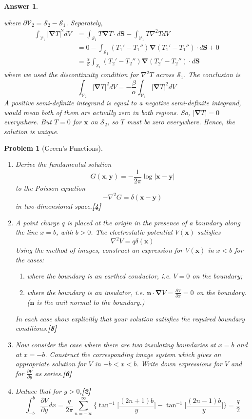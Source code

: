 \documentclass[a4paper]{article}
\newtheorem{ans}{Answer}[section]
\theoremstyle{new}
\newtheorem{qns}{Problem}[section]
\begin{document}
\begin{ans}
\begin{enumerate}[label=(\roman*)]
where $\partial\mathcal{V}_2=\mathcal{S}_2-\mathcal{S}_1$. Separately, 
\begin{align}
\int_{\mathcal{V}_1}|\boldsymbol{\nabla}T|^2dV&=\int_{\mathcal{S}_1}T\boldsymbol{\nabla}T\cdot d\mathbf{S}-\int_{\mathcal{V}_1}T\nabla^2TdV\nonumber\\&=0-\int_{\mathcal{S}_1}(T_1'-T_1'')\boldsymbol{\nabla}(T_1'-T_1'')\cdot d\mathbf{S}+0\nonumber\\&=\frac{\alpha}{\beta}\int_{\mathcal{S}_1}(T_2'-T_2'')\boldsymbol{\nabla}(T_2'-T_2'')\cdot d\mathbf{S}\nonumber
\end{align}
where we used the discontinuity condition for $\nabla^2T$ across $\mathcal{S}_1$. The conclusion is 
$$\int_{\mathcal{V}_2}|\boldsymbol{\nabla}T|^2dV=-\frac{\beta}{\alpha}\int_{\mathcal{V}_1}|\boldsymbol{\nabla}T|^2dV$$
A positive semi-definite integrand is equal to a negative semi-definite integrand, would mean both of them are actually zero in both regions. So, $|\boldsymbol{\nabla}T|=0$ everywhere. But $T=0$ for $\mathbf{x}$ on $\mathcal{S}_2$, so $T$ must be zero everywhere. Hence, the solution is unique.
\end{enumerate}
\end{ans}
\begin{qns}[Green's Functions]\leavevmode
\begin{enumerate}[label=(\alph*)]
\item Derive the fundamental solution
$$G(\mathbf{x},\mathbf{y})=-\frac{1}{2\pi}\log|\mathbf{x}-\mathbf{y}|$$
to the Poisson equation
$$-\nabla^2G=\delta(\mathbf{x}-\mathbf{y})$$
in two-dimensional space.\hfill\textbf{[4]}
\item 
A point charge $q$ is placed at the origin in the presence of a boundary along the line $x = b$, with $b > 0$. The electrostatic potential $V(\mathbf{x})$ satisfies
$$\nabla^2V=q\delta(\mathbf{x})$$
Using the method of images, construct an expression for $V(\mathbf{x})$ in $x < b$ for the cases:
\begin{enumerate}[label=(\roman*)]
    \item where the boundary is an earthed conductor, i.e. $V = 0$ on the boundary;
    \item where the boundary is an insulator, i.e. $\mathbf{n}\cdot\boldsymbol{\nabla}V=\frac{\partial V}{\partial x}=0$ on the boundary. ($\mathbf{n}$ is the unit normal to the boundary.)
\end{enumerate}
In each case show explicitly that your solution satisfies the required boundary conditions.\hfill\textbf{[8]}
\item Now consider the case where there are two insulating boundaries at $x = b$  and at $x = −b$. Construct the corresponding image system which gives an appropriate solution for $V$ in $−b < x < b$. Write down expressions for $V$ and for $\frac{\partial V}{\partial y}$ as series.\hfill\textbf{[6]}
\item Deduce that for $y > 0$,\hfill\textbf{[2]}
$$\int_{-b}^b\frac{\partial V}{\partial y}dx=\frac{q}{2\pi}\sum_{n=-\infty}^{\infty}\bigg\{\tan^{-1}\bigg[\frac{(2n+1)b}{y}\bigg]-\tan^{-1}\bigg[\frac{(2n-1)b}{y}\bigg]\bigg\}=\frac{q}{2}$$
\end{enumerate}
\end{qns}
\end{document}
